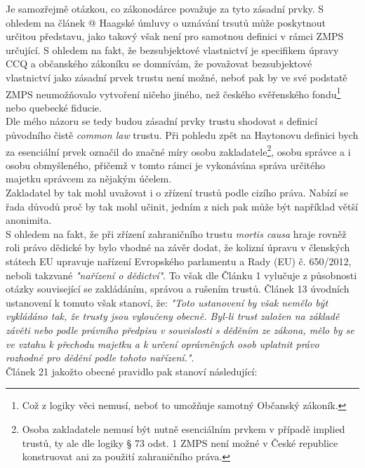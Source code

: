 \documentclass{article}
\makeatletter
\newcommand*{\rom}[1]{\expandafter\@slowromancap\romannumeral #1@}
\makeatother
\begin{document}
 Je samozřejmě otázkou, co zákonodárce považuje za tyto zásadní prvky. S ohledem na článek \rom{2} Haagské úmluvy o uznávání trsutů může poskytnout určitou představu, jako takový však není pro samotnou definici v rámci ZMPS určující. S ohledem na fakt, že bezsubjektové vlastnictví je specifikem úpravy CCQ a občanského zákoníku se domnívám, že považovat bezsubjektové vlastnictví jako zásadní prvek trustu není možné, neboť pak by ve své podstatě ZMPS neumožňovalo vytvoření ničeho jiného, než českého svěřenského fondu\footnote{Což z logiky věci nemusí, neboť to umožňuje samotný Občanský zákoník.} nebo quebecké fiducie.\\
 
 Dle mého názoru se tedy budou zásadní prvky trustu shodovat s definicí původního čistě \textit{common law} trustu. Při pohledu zpět na Haytonovu definici bych za esenciální prvek označil do značné míry osobu zakladatele\footnote{Osoba zakladatele nemusí být nutně esenciálním prvkem v případě implied trustů, ty ale dle logiky § 73 odst. 1 ZMPS není možné v České republice konstruovat ani za použití zahraničního práva.}, osobu správce a i osobu obmyšleného, přičemž v tomto rámci je vykonávána správa určitého majetku správcem za nějakým účelem.\\
 
 Zakladatel by tak mohl uvažovat i o zřízení trustů podle cizího práva. Nabízí se řada důvodů proč by tak mohl učinit, jedním z nich pak může být například větší anonimita.\\ 
 
 S ohledem na fakt, že při zřízení zahraničního trustu \textit{mortis causa} hraje rovněž roli právo dědické by bylo vhodné na závěr dodat, že kolizní úpravu v členských státech EU upravuje nařízení Evropského parlamentu a Rady (EU) č. 650/2012, neboli takzvané \textit{"nařízení o dědictví"}. To však dle Článku 1 vylučuje z působnosti otázky související se zakládáním, správou a rušením trustů. Článek 13 úvodních ustanovení k tomuto však stanoví, že: \textit{"Toto ustanovení by však nemělo být vykládáno tak, že trusty jsou vyloučeny obecně. Byl-li trust založen na základě závěti nebo podle právního předpisu v souvislosti s děděním ze zákona, mělo by se ve vztahu k přechodu majetku a k určení oprávněných osob uplatnit právo rozhodné pro dědění podle tohoto nařízení."}.\\
 
 Článek 21 jakožto obecné pravidlo pak stanoví následující:\\
 
\end{document}
